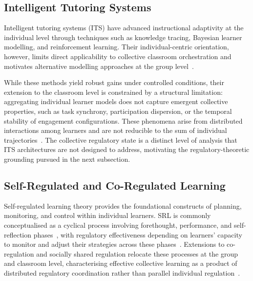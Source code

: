 \documentclass[preprint,12pt,authoryear]{elsarticle}
\begin{document}
\subsection{Intelligent Tutoring Systems}

Intelligent tutoring systems (ITS) have advanced instructional adaptivity at the individual level through techniques such as knowledge tracing, Bayesian learner modelling, and reinforcement learning. Their individual-centric orientation, however, limits direct applicability to collective classroom orchestration and motivates alternative modelling approaches at the group level~\citep{olsen2021}.

While these methods yield robust gains under controlled conditions, their extension to the classroom level is constrained by a structural limitation: aggregating individual learner models does not capture emergent collective properties, such as task synchrony, participation dispersion, or the temporal stability of engagement configurations. These phenomena arise from distributed interactions among learners and are not reducible to the sum of individual trajectories~\citep{olsen2021, molenaar2021}. The collective regulatory state is a distinct level of analysis that ITS architectures are not designed to address, motivating the regulatory-theoretic grounding pursued in the next subsection.

\subsection{Self-Regulated and Co-Regulated Learning}

Self-regulated learning theory provides the foundational constructs of planning, monitoring, and control within individual learners. SRL is commonly conceptualised as a cyclical process involving forethought, performance, and self-reflection phases~\citep{zimmerman2000}, with regulatory effectiveness depending on learners' capacity to monitor and adjust their strategies across these phases~\citep{panadero2017}. Extensions to co-regulation and socially shared regulation relocate these processes at the group and classroom level, characterising effective collective learning as a product of distributed regulatory coordination rather than parallel individual regulation~\citep{hadwin2018, jarvela2021}.
\end{document}
